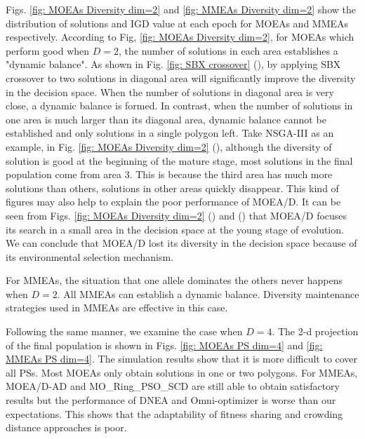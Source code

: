 \documentclass[conference]{IEEEtran}
\begin{document}
Figs. \ref{fig: MOEAs Diversity dim=2} and \ref{fig: MMEAs Diversity dim=2} show the  distribution of solutions and IGD value at each epoch for MOEAs and MMEAs respectively. According to Fig, \ref{fig: MOEAs Diversity dim=2}, for MOEAs which perform good when $D=2$, the number of solutions in each area establishes a "dynamic balance". As shown in Fig. \ref{fig: SBX crossover} (), by applying SBX crossover to two solutions in diagonal area will significantly improve the diversity in the decision space. When the number of solutions in diagonal area is very close, a dynamic balance is formed. In contrast, when the number of solutions in one area is much larger than its diagonal area, dynamic balance cannot be established and only solutions in a single polygon left. Take NSGA-III as an example, in Fig. \ref{fig: MOEAs Diversity dim=2} (), although the diversity of solution is good at the beginning of the mature stage, most solutions in the final population come from area 3. This is because the third area has much more solutions than others, solutions in other areas quickly disappear. This kind of figures may also help to explain the poor performance of MOEA/D. It can be seen from Figs. \ref{fig: MOEAs Diversity dim=2} () and () that MOEA/D focuses its search in a small area in the decision space at the young stage of evolution. We can conclude that MOEA/D lost its diversity in the decision space because of its environmental selection mechanism.

For MMEAs, the situation that one allele dominates the others never happens when $D=2$. All MMEAs can establish a dynamic balance. Diversity maintenance strategies used in MMEAs are effective in this case.

Following the same manner, we examine the case when $D=4$. The 2-d projection of the final population is shown in Figs. \ref{fig: MOEAs PS dim=4} and \ref{fig: MMEAs PS dim=4}. The simulation results show that it is more difficult to cover all PSs. Most MOEAs only obtain solutions in one or two polygons. For MMEAs, MOEA/D-AD and MO\_Ring\_PSO\_SCD are still able to obtain satisfactory results but the performance of DNEA and Omni-optimizer is worse than our expectations. This shows that the adaptability of fitness sharing and crowding distance approaches is poor. 
\end{document}
